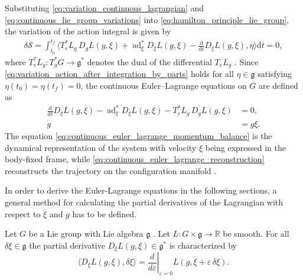 Substituting \eqref{eq:variation_continuous_lagrangian} and \eqref{eq:continuous_lie_group_variations} into \eqref{eq:hamilton_principle_lie_group}, the variation of the action integral is given by
\begin{align}
    \delta\mathcal S
    =
    \int_{t_0}^{t_f}
    \Bigg\langle
        T_e^*L_g\,D_gL(g,\xi)
        +\operatorname{ad}_{\xi}^*D_{\xi}L(g,\xi)
        -\frac{\mathrm d}{\mathrm dt}D_{\xi}L(g,\xi),
        \eta
    \Bigg\rangle
    \mathrm dt
    =0,
    \label{eq:variation_action_after_integration_by_parts}
\end{align}
where $T_e^*L_g:T_g^*G\rightarrow\mathfrak g^*$ denotes the dual of the differential $T_eL_g$ \cite{Lee2008}. Since \eqref{eq:variation_action_after_integration_by_parts} holds for all $\eta \in \mathfrak{g}$ satisfying $\eta(t_0)=\eta(t_f)=0$, the continuous Euler--Lagrange equations on $G$ are defined as
\begin{subequations}
\label{eq:continuous_euler_lagrange_lie_group}
\begin{align}
    \frac{\mathrm d}{\mathrm dt}D_{\xi}L(g,\xi)
    -\operatorname{ad}_{\xi}^*D_{\xi}L(g,\xi)
    -T_e^*L_g\,D_gL(g,\xi)
    &=0,
    \label{eq:continuous_euler_lagrange_momentum_balance}\\
    \dot g&=g\xi.
    \label{eq:continuous_euler_lagrange_reconstruction}
\end{align}
\end{subequations}
The equation \eqref{eq:continuous_euler_lagrange_momentum_balance} is the dynamical representation of the system with velocity $\xi$ being expressed in the body-fixed frame, while \eqref{eq:continuous_euler_lagrange_reconstruction} reconstructs the trajectory on the configuration manifold \cite{Lee2008}.

In order to derive the Euler-Lagrange equations in the following sections, a general method for calculating the partial derivatives of the Lagrangian with respect to $\xi$ and $g$ has to be defined.

\begin{proposition}
Let $G$ be a Lie group with Lie algebra $\mathfrak g$ \cite{Hall2000LieGroups}. Let $L:G\times\mathfrak g\to\mathbb R$
be smooth. For all $\delta\xi\in\mathfrak g$ the partial derivative $D_\xi L(g,\xi)\in\mathfrak g^*$ is characterized by
\begin{equation}\label{eq:derivative_omega}
\langle D_\xi L(g,\xi),\delta\xi\rangle
=\left.\frac{d}{d\varepsilon}\right|_{\varepsilon=0}L(g,\xi+\varepsilon\,\delta\xi).
\end{equation}
\end{proposition}


